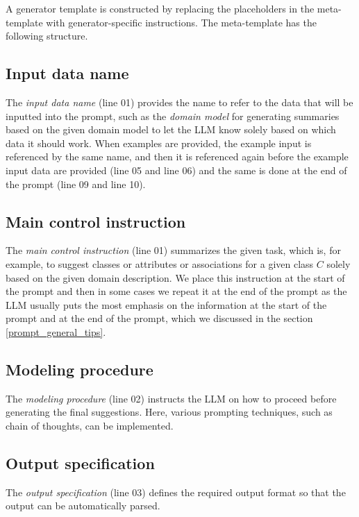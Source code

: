 A generator template is constructed by replacing the placeholders in the meta-template with generator-specific instructions. The meta-template has the following structure.


\subsection{Input data name}

The \emph{input data name} (line 01) provides the name to refer to the data that will be inputted into the prompt, such as the \textit{domain model} for generating summaries based on the given domain model to let the LLM know solely based on which data it should work. When examples are provided, the example input is referenced by the same name, and then it is referenced again before the example input data are provided (line 05 and line 06) and the same is done at the end of the prompt (line 09 and line 10).


\subsection{Main control instruction}

The \emph{main control instruction} (line 01) summarizes the given task, which is, for example, to suggest classes or attributes or associations for a given class $C$ solely based on the given domain description. We place this instruction at the start of the prompt and then in some cases we repeat it at the end of the prompt as the LLM usually puts the most emphasis on the information at the start of the prompt and at the end of the prompt, which we discussed in the section \ref{prompt_general_tips}.


\subsection{Modeling procedure}

The \textit{modeling procedure} (line 02) instructs the LLM on how to proceed before generating the final suggestions. Here, various prompting techniques, such as chain of thoughts, can be implemented.


\subsection{Output specification}

The \textit{output specification} (line 03) defines the required output format so that the output can be automatically parsed.


